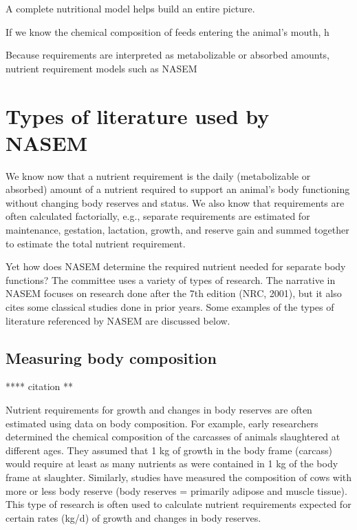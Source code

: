 \documentclass[
]{book}
\begin{document}
A complete nutritional model helps build an entire picture.

If we know the chemical composition of feeds entering the animal's mouth, h

Because requirements are interpreted as metabolizable or absorbed amounts, nutrient requirement models such as NASEM \citeyearpar{NASEM8}

\hypertarget{types-of-literature-used-by-nasem--nasem8}{%
\section{\texorpdfstring{Types of literature used by NASEM \citeyearpar{NASEM8}}{Types of literature used by NASEM {[}-@NASEM8{]}}}\label{types-of-literature-used-by-nasem--nasem8}}

We know now that a nutrient requirement is the daily (metabolizable or absorbed) amount of a nutrient required to support an animal's body functioning without changing body reserves and status. We also know that requirements are often calculated factorially, e.g., separate requirements are estimated for maintenance, gestation, lactation, growth, and reserve gain and summed together to estimate the total nutrient requirement.

Yet how does NASEM \citeyearpar{NASEM8} determine the required nutrient needed for separate body functions? The committee uses a variety of types of research. The narrative in NASEM \citeyearpar{NASEM8} focuses on research done after the 7th edition (NRC, 2001), but it also cites some classical studies done in prior years. Some examples of the types of literature referenced by NASEM are discussed below.

\hypertarget{measuring-body-composition}{%
\subsection{Measuring body composition}\label{measuring-body-composition}}

**** citation **

Nutrient requirements for growth and changes in body reserves are often estimated using data on body composition. For example, early researchers determined the chemical composition of the carcasses of animals slaughtered at different ages. They assumed that 1 kg of growth in the body frame (carcass) would require at least as many nutrients as were contained in 1 kg of the body frame at slaughter. Similarly, studies have measured the composition of cows with more or less body reserve (body reserves = primarily adipose and muscle tissue). This type of research is often used to calculate nutrient requirements expected for certain rates (kg/d) of growth and changes in body reserves.
\end{document}
